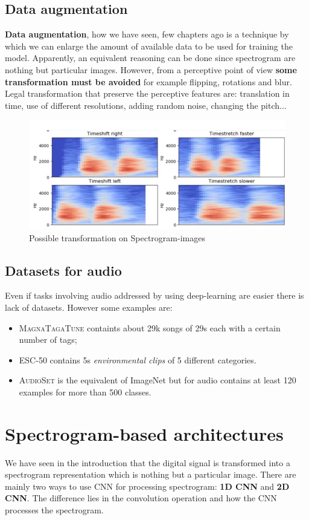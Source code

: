 \subsection{Data augmentation}
\textbf{Data augmentation}, how we have seen, few chapters ago is a technique by which we can enlarge the amount of available data to be used for training the model. Apparently, an equivalent reasoning can be done since spectrogram are nothing but particular images. However, from a perceptive point of view \textbf{some transformation must be avoided} for example flipping, rotations and blur. Legal transformation that preserve the perceptive features are: translation in time, use of different resolutions, adding random noise, changing the pitch...
\begin{figure}[h]
    \centering
    \includegraphics[scale=0.7]{img/DataAugmentation_audio.png}
    \caption{Possible transformation on Spectrogram-images}
\end{figure}

\subsection{Datasets for audio}
Even if tasks involving audio addressed by using deep-learning are easier there is lack of datasets. However some examples are:
\begin{itemize}
    \itemsep-0.3em
    \item \textsc{MagnaTagaTune} containts about 29k songs of 29s each with a certain number of tags; 
    \item \textsc{ESC-50} contains 5s \textit{environmental clips} of 5 different categories.
    \item \textsc{AudioSet} is the equivalent of ImageNet but for audio contains at least 120 examples for more than 500 classes.
\end{itemize}

\section{Spectrogram-based architectures}
We have seen in the introduction that the digital signal is transformed into a spectrogram representation which is nothing but a particular image. There are mainly two ways to use CNN for processing spectrogram: \textbf{1D CNN} and \textbf{2D CNN}. The difference lies in the convolution operation and how the CNN processes the spectrogram.
